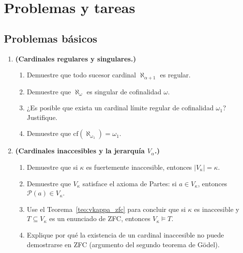 \section*{Problemas y tareas}

\subsection*{Problemas básicos}

\begin{enumerate}[leftmargin=2em, label=\textbf{P\arabic*.}]

  \item \textbf{(Cardinales regulares y singulares.)}
  \begin{enumerate}[label=(\alph*)]
    \item Demuestre que todo sucesor cardinal $\aleph_{\alpha+1}$ es regular.
    \item Demuestre que $\aleph_\omega$ es singular de cofinalidad $\omega$.
    \item ¿Es posible que exista un cardinal límite regular de cofinalidad $\omega_1$? Justifique.
    \item Demuestre que $\mathrm{cf}(\aleph_{\omega_1}) = \omega_1$.
  \end{enumerate}

  \item \textbf{(Cardinales inaccesibles y la jerarquía $V_\alpha$.)}
  \begin{enumerate}[label=(\alph*)]
    \item Demuestre que si $\kappa$ es fuertemente inaccesible, entonces $|V_\kappa| = \kappa$.
    \item Demuestre que $V_\kappa$ satisface el axioma de Partes: si $a \in V_\kappa$, entonces $\mathcal{P}(a) \in V_\kappa$.
    \item Use el Teorema~\ref{teo:vkappa_zfc} para concluir que si $\kappa$ es inaccesible y $T \subseteq V_\kappa$ es un enunciado de ZFC, entonces $V_\kappa \models T$.
    \item Explique por qué la existencia de un cardinal inaccesible no puede demostrarse en ZFC (argumento del segundo teorema de Gödel).
  \end{enumerate}


\end{enumerate}
